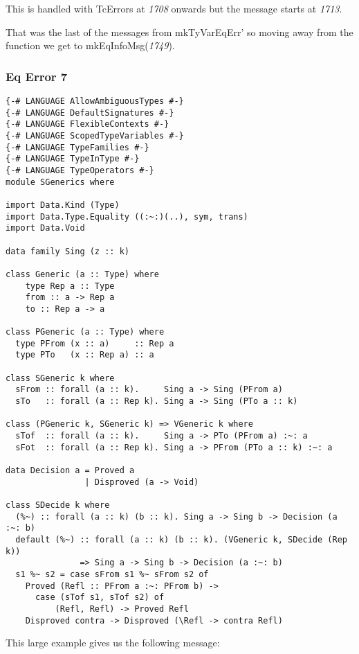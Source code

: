 \documentclass[a4paper]{article}
\begin{document}
This is handled with TcErrors at \textit{1708} onwards but the message starts at \textit{1713}. 


That was the last of the messages from mkTyVarEqErr' so moving away from the function we get to mkEqInfoMsg(\textit{1749}).

\subsubsection{Eq Error 7}

\begin{lstlisting}[label={lst: T13.0}, numbers=none, caption={Example Program \cite{ex13}}]
{-# LANGUAGE AllowAmbiguousTypes #-}
{-# LANGUAGE DefaultSignatures #-}
{-# LANGUAGE FlexibleContexts #-}
{-# LANGUAGE ScopedTypeVariables #-}
{-# LANGUAGE TypeFamilies #-}
{-# LANGUAGE TypeInType #-}
{-# LANGUAGE TypeOperators #-}
module SGenerics where

import Data.Kind (Type)
import Data.Type.Equality ((:~:)(..), sym, trans)
import Data.Void

data family Sing (z :: k)

class Generic (a :: Type) where
    type Rep a :: Type
    from :: a -> Rep a
    to :: Rep a -> a

class PGeneric (a :: Type) where
  type PFrom (x :: a)     :: Rep a
  type PTo   (x :: Rep a) :: a

class SGeneric k where
  sFrom :: forall (a :: k).     Sing a -> Sing (PFrom a)
  sTo   :: forall (a :: Rep k). Sing a -> Sing (PTo a :: k)

class (PGeneric k, SGeneric k) => VGeneric k where
  sTof  :: forall (a :: k).     Sing a -> PTo (PFrom a) :~: a
  sFot  :: forall (a :: Rep k). Sing a -> PFrom (PTo a :: k) :~: a

data Decision a = Proved a
                | Disproved (a -> Void)

class SDecide k where
  (%~) :: forall (a :: k) (b :: k). Sing a -> Sing b -> Decision (a :~: b)
  default (%~) :: forall (a :: k) (b :: k). (VGeneric k, SDecide (Rep k))
               => Sing a -> Sing b -> Decision (a :~: b)
  s1 %~ s2 = case sFrom s1 %~ sFrom s2 of
    Proved (Refl :: PFrom a :~: PFrom b) ->
      case (sTof s1, sTof s2) of
          (Refl, Refl) -> Proved Refl
    Disproved contra -> Disproved (\Refl -> contra Refl)
\end{lstlisting}

This large example gives us the following message:
\end{document}

